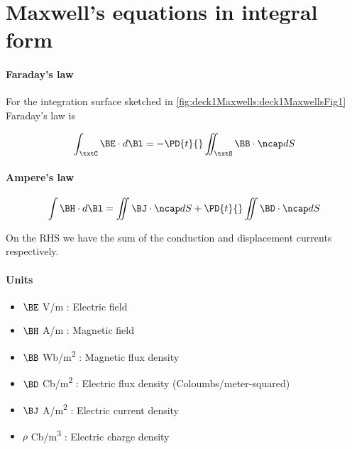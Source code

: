 %
%
\section{Maxwell's equations in integral form}
\paragraph{Faraday's law}
For the integration surface sketched in \cref{fig:deck1Maxwells:deck1MaxwellsFig1} Faraday's law is


\begin{equation}\label{eqn:uwavesLecture1:20}
\int_\txtC \BE \cdot d\Bl = - \PD{t}{} \iint_\txtS \BB \cdot \ncap dS
\end{equation}

\paragraph{Ampere's law}
\begin{equation}\label{eqn:uwavesLecture1:40}
\int \BH \cdot d\Bl = \iint \BJ \cdot \ncap dS + \PD{t}{} \iint \BD \cdot \ncap dS
\end{equation}

On the RHS we have the sum of the conduction and displacement currents respectively.

\paragraph{Units}
\begin{itemize}
\item \( \BE \) \si{V/m} : Electric field
\item \( \BH \) \si{A/m} : Magnetic field
\item \( \BB \) \si{Wb/m^2} : Magnetic flux density
\item \( \BD \) \si{Cb/m^2} : Electric flux density (Coloumbs/meter-squared)
\item \( \BJ \) \si{A/m^2} : Electric current density
\item \( \rho \) \si{Cb/m^3} : Electric charge density
\end{itemize}

